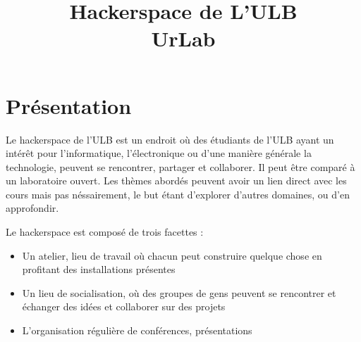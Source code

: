 \documentclass{article}
\title{Hackerspace de L'ULB\\ \fontsize{90}{100}\selectfont UrLab}
\author{ }
\begin{document}
\maketitle{}
\newpage
\tableofcontents
\newpage
\setlength{\parskip}{0.5ex plus 0.2ex minus 0.2ex}
\setlength{\parindent}{0pt}

\section{Présentation}

Le hackerspace de l'ULB est un endroit où des étudiants de l'ULB ayant un intérêt 
pour l'informatique, l'électronique ou d'une manière générale la technologie, 
peuvent se rencontrer, partager et collaborer. Il peut être comparé à un laboratoire ouvert.
Les thèmes abordés peuvent avoir un lien direct avec les cours mais pas néssairement, le but étant d'explorer d'autres domaines, ou d'en approfondir.

Le hackerspace est composé de trois facettes : 
\begin{itemize}
\item Un atelier, lieu de travail où chacun peut construire quelque chose en profitant 
des installations présentes
\item Un lieu de socialisation, où des groupes de gens peuvent se rencontrer
et échanger des idées et collaborer sur des projets
\item L'organisation régulière de conférences, présentations\end{itemize}
\end{document}

